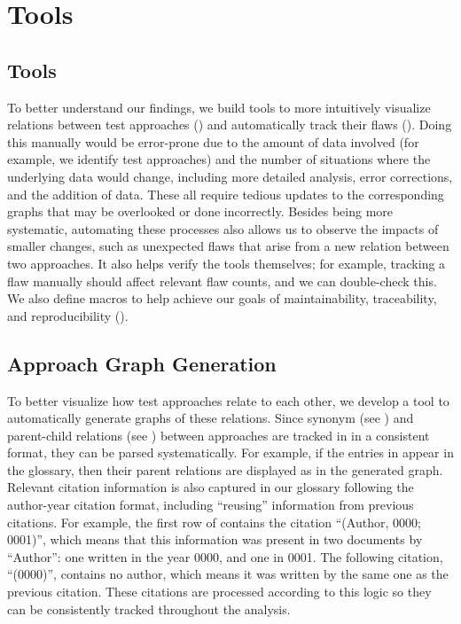 \ifnotpaper
    \section{Tools}
\else
    \subsection{Tools}
\fi
\label{tools}

\ifnotpaper
    To better understand our findings, we build tools to more intuitively
    visualize relations between test approaches () and
    automatically track their flaws (). Doing
    this manually would be error-prone due to the amount of data involved (for
    example, we identify \approachCount{} test approaches) and the number of
    situations where the underlying data would change, including more detailed
    analysis, error corrections, and the addition of data. These all require
    tedious updates to the corresponding graphs that may be overlooked or done
    incorrectly. Besides being more systematic, automating these processes also
    allows us to observe the impacts of smaller changes, such as unexpected
    flaws that arise from a new relation between two approaches. It
    also helps verify the tools themselves; for example, tracking a flaw
    manually should affect relevant flaw counts, and we can
    double-check this. We also define macros to help achieve our goals of
    maintainability, traceability, and reproducibility ().

    \subsection{Approach Graph Generation}
    \label{graph-gen}
\fi

To better visualize how test approaches relate to each other, we
develop a tool to automatically generate graphs of these relations.
\ifnotpaper Since synonym (see ) and parent-child relations
    (see ) between approaches are tracked in
    \ourApproachGlossary{} in a consistent format, they can be parsed
    systematically. For example, if the entries in 
    appear in the glossary, then their parent relations are displayed as
     in the generated graph. Relevant citation
    information is also captured in our glossary following the author-year
    citation format, including ``reusing'' information from previous
    citations. For example, the first row of 
    contains the citation ``(Author, 0000; 0001)'', which means that this
    information was present in two documents by ``Author'': one written in
    the year 0000, and one in 0001. The following citation, ``(0000)'',
    contains no author, which means it was written by the same one as the
    previous citation. These citations are processed according to this
    logic  so they can be
    consistently tracked throughout the analysis.

